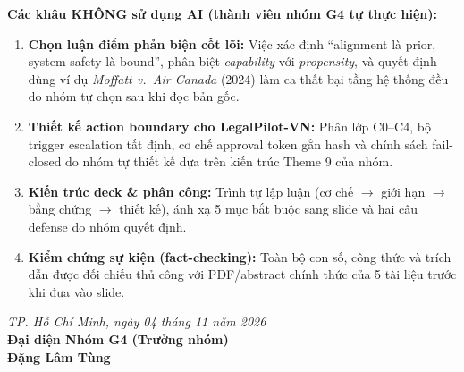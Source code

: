 \documentclass[11pt,a4paper]{article}
\begin{document}
\vspace{0.3cm}
\noindent \textbf{\large Các khâu KHÔNG sử dụng AI (thành viên nhóm G4 tự thực hiện):}
\begin{enumerate}
  \item \textbf{Chọn luận điểm phản biện cốt lõi:} Việc xác định ``alignment là prior, system safety là bound'', phân biệt \emph{capability} với \emph{propensity}, và quyết định dùng ví dụ \emph{Moffatt v.\ Air Canada} (2024) làm ca thất bại tầng hệ thống đều do nhóm tự chọn sau khi đọc bản gốc.
  \item \textbf{Thiết kế action boundary cho LegalPilot-VN:} Phân lớp C0--C4, bộ trigger escalation tất định, cơ chế approval token gắn hash và chính sách fail-closed do nhóm tự thiết kế dựa trên kiến trúc Theme 9 của nhóm.
  \item \textbf{Kiến trúc deck \& phân công:} Trình tự lập luận (cơ chế $\to$ giới hạn $\to$ bằng chứng $\to$ thiết kế), ánh xạ 5 mục bắt buộc sang slide và hai câu defense do nhóm quyết định.
  \item \textbf{Kiểm chứng sự kiện (fact-checking):} Toàn bộ con số, công thức và trích dẫn được đối chiếu thủ công với PDF/abstract chính thức của 5 tài liệu trước khi đưa vào slide.
\end{enumerate}

\vspace{0.8cm}
\begin{flushright}
  \textit{TP. Hồ Chí Minh, ngày 04 tháng 11 năm 2026}\\[0.2cm]
  \textbf{Đại diện Nhóm G4 (Trưởng nhóm)}\\[1.5cm]
  \textbf{Đặng Lâm Tùng}
\end{flushright}
\end{document}
